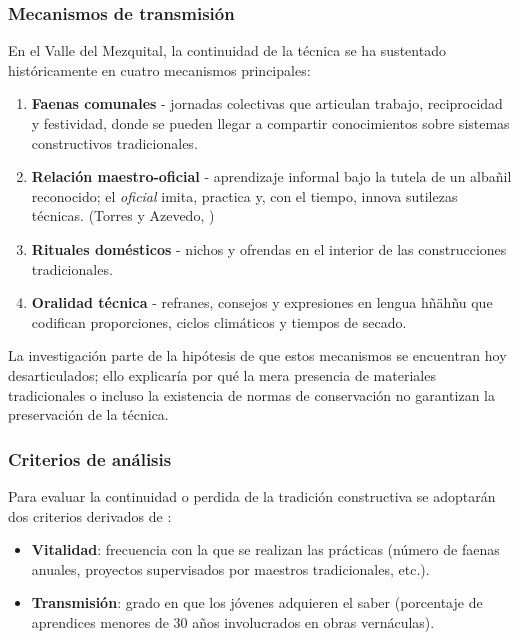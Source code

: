 \subsubsection{Mecanismos de transmisión}

En el Valle del Mezquital, la continuidad de la técnica se ha sustentado
históricamente en cuatro mecanismos principales:

\begin{enumerate}
	\item \textbf{Faenas comunales} - jornadas colectivas que
	      articulan trabajo, reciprocidad y festividad, donde se pueden llegar a
	      compartir conocimientos sobre sistemas constructivos tradicionales.
	\item \textbf{Relación maestro-oficial} - aprendizaje informal bajo la
	      tutela de un albañil reconocido; el
	      \emph{oficial} imita, practica y, con el tiempo, innova sutilezas
	      técnicas. (Torres y Azevedo, \citeyear{torres2021transmision})
	\item \textbf{Rituales domésticos} - nichos y ofrendas en el interior
	      de las construcciones tradicionales.
	\item \textbf{Oralidad técnica} - refranes, consejos y
	      expresiones en lengua hñähñu que codifican proporciones, ciclos
	      climáticos y tiempos de secado.
\end{enumerate}

La investigación parte de la hipótesis de que estos mecanismos se
encuentran hoy desarticulados; ello explicaría por qué la mera
presencia de materiales tradicionales o incluso la existencia de normas
de conservación no garantizan la preservación de la técnica.

\subsubsection{Criterios de análisis}

Para evaluar la continuidad o perdida de la tradición constructiva
se adoptarán dos criterios derivados de \cite{UNESCO2005diversidad}:

\begin{itemize}
	\item \textbf{Vitalidad}: frecuencia con la que se realizan las
	      prácticas (número de faenas anuales, proyectos supervisados por
	      maestros tradicionales, etc.).
	\item \textbf{Transmisión}: grado en que los jóvenes adquieren el
	      saber (porcentaje de aprendices menores de 30 años involucrados
	      en obras vernáculas).
\end{itemize}

